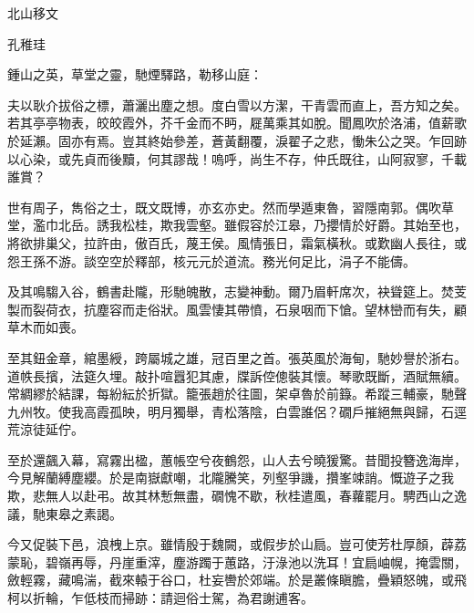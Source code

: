 北山移文

孔稚珪

鍾山之英，草堂之靈，馳煙驛路，勒移山庭：

夫以耿介拔俗之標，蕭灑出塵之想。度白雪以方潔，干青雲而直上，吾方知之矣。若其亭亭物表，皎皎霞外，芥千金而不眄，屣萬乘其如脫。聞鳳吹於洛浦，值薪歌於延瀨。固亦有焉。豈其終始參差，蒼黃翻覆，淚翟子之悲，慟朱公之哭。乍回跡以心染，或先貞而後黷，何其謬哉！嗚呼，尚生不存，仲氏既往，山阿寂寥，千載誰賞？

世有周子，雋俗之士，既文既博，亦玄亦史。然而學遁東魯，習隱南郭。偶吹草堂，濫巾北岳。誘我松桂，欺我雲壑。雖假容於江皋，乃攖情於好爵。其始至也，將欲排巢父，拉許由，傲百氏，蔑王侯。風情張日，霜氣橫秋。或歎幽人長往，或怨王孫不游。談空空於釋部，核元元於道流。務光何足比，涓子不能儔。

及其鳴騶入谷，鶴書赴隴，形馳魄散，志變神動。爾乃眉軒席次，袂聳筵上。焚芰製而裂荷衣，抗塵容而走俗狀。風雲悽其帶憤，石泉咽而下愴。望林巒而有失，顧草木而如喪。

至其鈕金章，綰墨綬，跨屬城之雄，冠百里之首。張英風於海甸，馳妙譽於浙右。道帙長擯，法筵久埋。敲扑喧囂犯其慮，牒訴倥傯裝其懷。琴歌既斷，酒賦無續。常綢繆於結課，每紛紜於折獄。籠張趙於往圖，架卓魯於前籙。希蹤三輔豪，馳聲九州牧。使我高霞孤映，明月獨舉，青松落陰，白雲誰侶？礀戶摧絕無與歸，石逕荒涼徒延佇。

至於還飆入幕，寫霧出楹，蕙帳空兮夜鶴怨，山人去兮曉猨驚。昔聞投簪逸海岸，今見解蘭縛塵纓。於是南嶽獻嘲，北隴騰笑，列壑爭譏，攢峯竦誚。慨遊子之我欺，悲無人以赴弔。故其林慙無盡，礀愧不歇，秋桂遣風，春蘿罷月。騁西山之逸議，馳東皋之素謁。

今又促裝下邑，浪栧上京。雖情殷于魏闕，或假步於山扃。豈可使芳杜厚顏，薜荔蒙恥，碧嶺再辱，丹崖重滓，塵游躅于蕙路，汙淥池以洗耳！宜扃岫幌，掩雲關，斂輕霧，藏鳴湍，截來轅于谷口，杜妄轡於郊端。於是叢條瞋膽，疊穎怒魄，或飛柯以折輪，乍低枝而掃跡：請迴俗士駕，為君謝逋客。